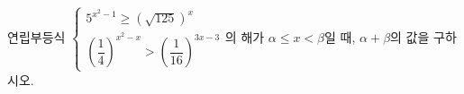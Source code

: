 연립부등식 $\begin{cases} 5^{x^2-1}\ge(\sqrt{125})^{x} \\[1ex] \left(\dfrac{1}{4}\right)^{x^2-x}>\left(\dfrac{1}{16}\right)^{3x-3} \end{cases}$의 해가 $\alpha\le x<\beta$일 때, $\alpha+\beta$의 값을 구하시오.
